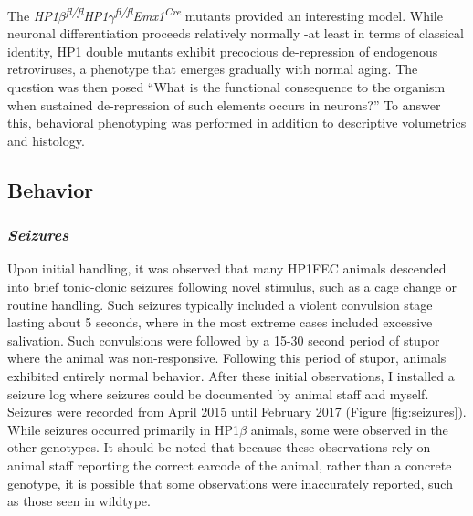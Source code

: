 \documentclass[onehalf,12pt]{beavtex}
\begin{document}
  The
  \emph{HP1\(\beta\)\textsuperscript{fl/fl}HP1\(\gamma\)\textsuperscript{fl/fl}Emx1\textsuperscript{Cre}}
  mutants provided an interesting model. While neuronal differentiation
  proceeds relatively normally -at least in terms of classical identity,
  HP1 double mutants exhibit precocious de-repression of endogenous
  retroviruses, a phenotype that emerges gradually with normal aging. The
  question was then posed ``What is the functional consequence to the
  organism when sustained de-repression of such elements occurs in
  neurons?'' To answer this, behavioral phenotyping was performed in
  addition to descriptive volumetrics and histology.
  
  \subsection{Behavior}\label{behavior}
  
  \subsubsection*{\texorpdfstring{\emph{Seizures}}{Seizures}}\label{seizures}
  
  Upon initial handling, it was observed that many HP1FEC animals
  descended into brief tonic-clonic seizures following novel stimulus,
  such as a cage change or routine handling. Such seizures typically
  included a violent convulsion stage lasting about 5 seconds, where in
  the most extreme cases included excessive salivation. Such convulsions
  were followed by a 15-30 second period of stupor where the animal was
  non-responsive. Following this period of stupor, animals exhibited
  entirely normal behavior. After these initial observations, I installed
  a seizure log where seizures could be documented by animal staff and
  myself. Seizures were recorded from April 2015 until February 2017
  (Figure \ref{fig:seizures}). While seizures occurred primarily in
  HP1\(\beta\) animals, some were observed in the other genotypes. It
  should be noted that because these observations rely on animal staff
  reporting the correct earcode of the animal, rather than a concrete
  genotype, it is possible that some observations were inaccurately
  reported, such as those seen in wildtype.\\
  
\end{document}
